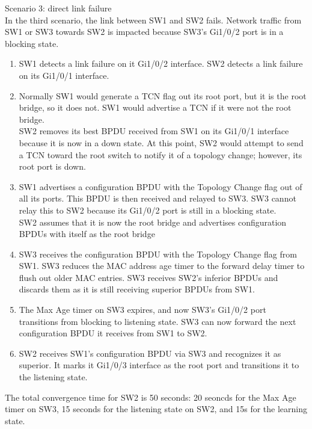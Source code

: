 \documentclass[parindent=0pt]{article}
\begin{document}
	Scenario 3: direct link failure\\
	In the third scenario, the link between SW1 and SW2 fails. Network traffic from SW1 or SW3 towards SW2 is impacted because SW3's Gi1/0/2 port is in a blocking state.
		\begin{enumerate}
			\item SW1 detects a link failure on it Gi1/0/2 interface. SW2 detects a link failure on its Gi1/0/1 interface.
			\item Normally SW1 would generate a TCN flag out its root port, but it is the root bridge, so it does not. SW1 would advertise a TCN if it were not the root bridge.\\
				SW2 removes its best BPDU received from SW1 on its Gi1/0/1 interface because it is now in a down state. At this point, SW2 would attempt to send a TCN toward the root switch to notify it of a topology change; however, its root port is down.
			\item SW1 advertises a configuration BPDU with the Topology Change flag out of all its ports. This BPDU is then received and relayed to SW3. SW3 cannot relay this to SW2 because its Gi1/0/2 port is still in a blocking state.\\
				SW2 assumes that it is now the root bridge and advertises configuration BPDUs with itself as the root bridge
			\item SW3 receives the configuration BPDU with the Topology Change flag from SW1. SW3 reduces the MAC address age timer to the forward delay timer to flush out older MAC entries. SW3 receives SW2's inferior BPDUs and discards them as it is still receiving superior BPDUs from SW1. 
			\item The Max Age timer on SW3 expires, and now SW3's Gi1/0/2 port transitions from blocking to listening state. SW3 can now forward the next configuration BPDU it receives from SW1 to SW2.
			\item SW2 receives SW1's configuration BPDU via SW3 and recognizes it as superior. It marks it Gi1/0/3 interface as the root port and transitions it to the listening state.
		\end{enumerate}
			The total convergence time for SW2 is 50 seconds: 20 seoncds for the Max Age timer on SW3, 15 seconds for the listening state on SW2, and 15s for the learning state.\\
\end{document}

